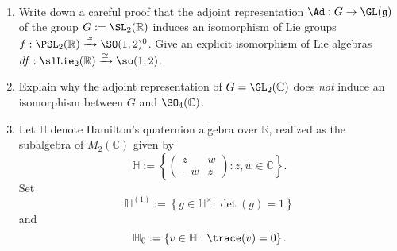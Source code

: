 \documentclass[reqno]{amsart} 
\begin{document}
\begin{homework}
~
  \begin{enumerate}
  \item Write down a careful proof that the adjoint representation $\Ad : G \rightarrow \GL(\mathfrak{g})$ of the group $G := \SL_2(\mathbb{R})$ induces an isomorphism of Lie groups $f : \PSL_2(\mathbb{R}) \xrightarrow{\cong} \SO(1,2)^0$.  Give an explicit isomorphism of Lie algebras $d f : \slLie_2(\mathbb{R}) \xrightarrow{\cong } \so(1,2)$.
  \item Explain why the adjoint representation of $G = \GL_2(\mathbb{C})$ does \emph{not} induce an isomorphism between $G$ and $\SO_4(\mathbb{C})$.
  \item Let $\mathbb{H}$ denote Hamilton's quaternion algebra over $\mathbb{R}$, realized as the subalgebra of $M_2(\mathbb{C})$ given by
    \begin{equation*}
      \mathbb{H} := \left\{
        \begin{pmatrix}
          z & w \\
          -\overline{w} & \overline{z}
        \end{pmatrix}
        :z,w \in \mathbb{C} \right\}.
    \end{equation*}
    Set
    \begin{equation*}
      \mathbb{H}^{(1)} := \left\{ g \in \mathbb{H}^\times : \det(g) = 1 \right\}
    \end{equation*}
    and
    \begin{equation*}
      \mathbb{H}_0 := \left\{ v \in \mathbb{H} : \trace(v) = 0 \right\}.
    \end{equation*}
\end{enumerate}
\end{homework}
\end{document}
